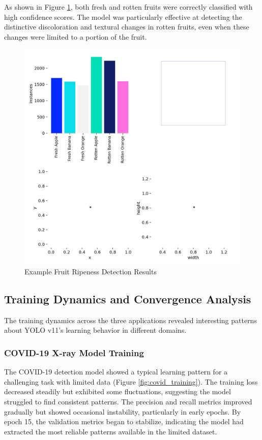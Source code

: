 \begin{multicols}{2}
As shown in Figure \ref{fig:fruit_examples}, both fresh and rotten fruits were correctly classified with high confidence scores. The model was particularly effective at detecting the distinctive discoloration and textural changes in rotten fruits, even when these changes were limited to a portion of the fruit.

\begin{figure}[h]
\centering
\includegraphics[width=0.9\columnwidth]{../datas/agriculture/labels.jpg}
\caption{Example Fruit Ripeness Detection Results}
\label{fig:fruit_examples}
\end{figure}

\subsection{Training Dynamics and Convergence Analysis}

The training dynamics across the three applications revealed interesting patterns about YOLO v11's learning behavior in different domains.

\subsubsection{COVID-19 X-ray Model Training}

The COVID-19 detection model showed a typical learning pattern for a challenging task with limited data (Figure \ref{fig:covid_training}). The training loss decreased steadily but exhibited some fluctuations, suggesting the model struggled to find consistent patterns. The precision and recall metrics improved gradually but showed occasional instability, particularly in early epochs. By epoch 15, the validation metrics began to stabilize, indicating the model had extracted the most reliable patterns available in the limited dataset.


\end{multicols}
